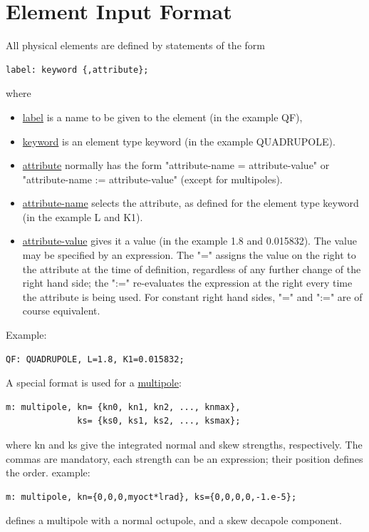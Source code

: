 \section{Element Input Format}
All physical elements are defined by statements of the form 
\begin{verbatim}
label: keyword {,attribute};
\end{verbatim} 
where 
\begin{itemize}
  \item \href{label.html}{label} is a name to be given to the element (in the example QF), 
  \item \href{keyword.html}{keyword} is an element type keyword (in the example QUADRUPOLE). 
  \item \href{attribute.html}{attribute} normally has the form
    "attribute-name = attribute-value" or
    "attribute-name := attribute-value" (except for multipoles).  
  \item \href{label.html}{attribute-name} selects the attribute,
    as defined for the element type keyword (in the example L and
    K1).  
  \item \href{attribute.html}{attribute-value} gives it a value
    (in the example 1.8 and 0.015832). The value may be specified
    by an expression. The "=" assigns the value on the right to
    the attribute at the time of definition, regardless of any
    further change of the right hand side; the ":=" re-evaluates
    the expression at the right every time the attribute is being
    used. For constant right hand sides, "=" and ":=" are of
    course equivalent.  
\end{itemize} 


Example: 
\begin{verbatim}
QF: QUADRUPOLE, L=1.8, K1=0.015832;
\end{verbatim} 

A special format is used for a \href{multipole.html}{multipole}: 
\begin{verbatim}
m: multipole, kn= {kn0, kn1, kn2, ..., knmax},
              ks= {ks0, ks1, ks2, ..., ksmax};
\end{verbatim} 
where kn and ks give the integrated normal and skew strengths,
respectively. The commas are mandatory, each strength can be an
expression; their position defines the order. example:  
\begin{verbatim}
m: multipole, kn={0,0,0,myoct*lrad}, ks={0,0,0,0,-1.e-5};
\end{verbatim} 
defines a multipole with a normal octupole, and a skew decapole component. 

